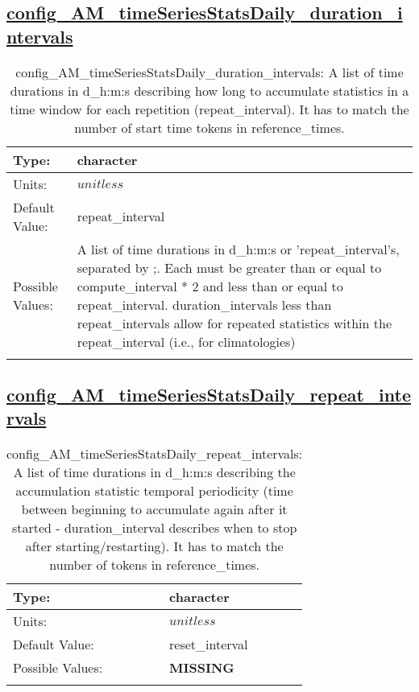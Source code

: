 \subsection[config\_AM\_timeSeriesStatsDaily\_duration\_intervals]{\hyperref[sec:nm_tab_AM_timeSeriesStatsDaily]{config\_AM\_timeSeriesStatsDaily\_duration\_intervals}}
\label{subsec:nm_sec_config_AM_timeSeriesStatsDaily_duration_intervals}
\begin{center}
\begin{longtable}{| p{2.0in} || p{4.0in} |}
    \hline
    Type: & character \\
    \hline
    Units: & $unitless$ \\
    \hline
    Default Value: & repeat\_interval \\
    \hline
    Possible Values: & A list of time durations in d\_h:m:s or 'repeat\_interval's, separated by ;. Each must be greater than or equal to compute\_interval * 2 and less than or equal to repeat\_interval. duration\_intervals less than repeat\_intervals allow for repeated statistics within the repeat\_interval (i.e., for climatologies) \\
    \hline
    \caption{config\_AM\_timeSeriesStatsDaily\_duration\_intervals: A list of time durations in d\_h:m:s describing how long to accumulate statistics in a time window for each repetition (repeat\_interval). It has to match the number of start time tokens in reference\_times.}
\end{longtable}
\end{center}
\subsection[config\_AM\_timeSeriesStatsDaily\_repeat\_intervals]{\hyperref[sec:nm_tab_AM_timeSeriesStatsDaily]{config\_AM\_timeSeriesStatsDaily\_repeat\_intervals}}
\label{subsec:nm_sec_config_AM_timeSeriesStatsDaily_repeat_intervals}
\begin{center}
\begin{longtable}{| p{2.0in} || p{4.0in} |}
    \hline
    Type: & character \\
    \hline
    Units: & $unitless$ \\
    \hline
    Default Value: & reset\_interval \\
    \hline
    Possible Values: & {\bf \color{red} MISSING} \\
    \hline
    \caption{config\_AM\_timeSeriesStatsDaily\_repeat\_intervals: A list of time durations in d\_h:m:s describing the accumulation statistic temporal periodicity (time between beginning to accumulate again after it started - duration\_interval describes when to stop after starting/restarting). It has to match the number of tokens in reference\_times.}
\end{longtable}
\end{center}
